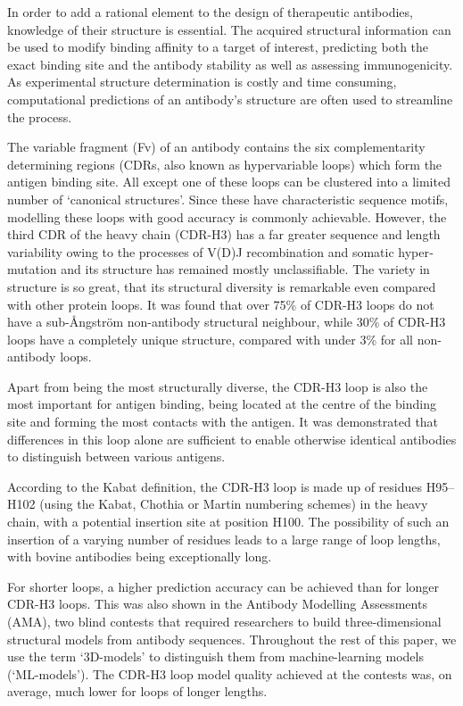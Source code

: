 \documentclass[12pt]{article}
\begin{document}
In order to add a rational element to the design of therapeutic antibodies, knowledge of
their structure is essential. The acquired structural information can
be used to modify binding affinity to a target of interest,
predicting both the exact binding site and the antibody stability as
well as assessing immunogenicity\cite{Abhinandan2007}. As
experimental structure determination is costly and time
consuming, computational predictions of an antibody's structure are often
used to streamline the process.

The variable
fragment (Fv) of an antibody contains the six complementarity determining regions
(CDRs, also known as hypervariable loops) which form the antigen binding site.
All except one of these loops can be clustered
into a limited number of `canonical structures'\cite{Al-Lazikani}.
Since these have characteristic sequence motifs, modelling
these loops with good accuracy is commonly
achievable\cite{North2011}.  However, the third CDR of the 
heavy chain (CDR-H3) has a far greater sequence and length variability owing to the
processes of V(D)J recombination and somatic hyper‐mutation and its
structure has remained mostly unclassifiable\cite{Finn2016}. The variety in
structure is so great, that its structural diversity is remarkable
even compared with other protein loops\cite{Regep2017}. It was found
that over 75\% of CDR-H3 loops do not have a sub-{\AA}ngstr\"{o}m non-antibody
structural neighbour, while 30\% of CDR-H3 loops have a
completely unique structure, compared with under 3\% for all non-antibody
loops\cite{Regep2017}.

Apart from being the most structurally diverse, the CDR-H3 loop is
also the most important for antigen binding, being located at the
centre of the binding site and forming the most contacts with the
antigen\cite{MacCallum1996}. It was demonstrated that
differences in this loop alone are sufficient to enable otherwise
identical antibodies to distinguish between various
antigens\cite{Xu2000}.

According to the Kabat definition, the CDR-H3 loop is made up of
residues H95--H102 (using the Kabat\cite{Kabat1992}, Chothia\cite{Al-Lazikani} or Martin\cite{Abhinandan2008} numbering schemes) in the heavy
chain, with a potential insertion site at position H100. The
possibility of such an insertion of a varying number of residues leads
to a large range of loop lengths, with bovine antibodies being
exceptionally long.


For shorter loops, a higher prediction accuracy can be achieved than
for longer CDR-H3 loops. This was also shown in the Antibody Modelling
Assessments (AMA), two blind contests that required researchers to
build three-dimensional structural models from antibody sequences.
Throughout the rest of this paper, we use the term `3D-models' to distinguish them from machine-learning models (`ML-models'). The CDR-H3 loop
model quality achieved at the contests was, on average, much lower
for loops of longer lengths\cite{Almagro2011,Almagro2014}.
\end{document}
